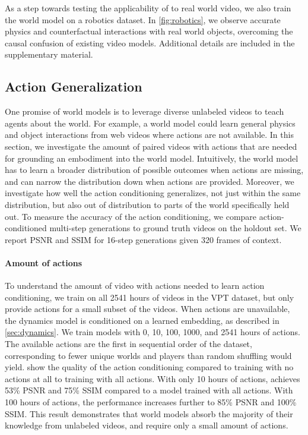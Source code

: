 \documentclass[11pt]{article}
\begin{document}
As a step towards testing the applicability of \method to real world video, we also train the world model on a robotics dataset\citep{soar}.
In \cref{fig:robotics}, we observe accurate physics and counterfactual interactions with real world objects, overcoming the causal confusion of existing video models.
Additional details are included in the supplementary material.

\subsection{Action Generalization}
\label{sec:actgen}

One promise of world models is to leverage diverse unlabeled videos to teach agents about the world.
For example, a world model could learn general physics and object interactions from web videos where actions are not available.
In this section, we investigate the amount of paired videos with actions that are needed for grounding an embodiment into the \method world model.
Intuitively, the world model has to learn a broader distribution of possible outcomes when actions are missing, and can narrow the distribution down when actions are provided.
Moreover, we investigate how well the action conditioning generalizes, not just within the same distribution, but also out of distribution to parts of the world specifically held out.
To measure the accuracy of the action conditioning, we compare action-conditioned multi-step generations to ground truth videos on the holdout set.
We report PSNR and SSIM for 16-step generations given 320 frames of context.



\paragraph{Amount of actions}
To understand the amount of video with actions needed to learn action conditioning, we train \method on all 2541 hours of videos in the VPT dataset, but only provide actions for a small subset of the videos.
When actions are unavailable, the dynamics model is conditioned on a learned embedding, as described in \cref{sec:dynamics}.
We train \method models with 0, 10, 100, 1000, and 2541 hours of actions.
The available actions are the first in sequential order of the dataset, corresponding to fewer unique worlds and players than random shuffling would yield.
 show the quality of the action conditioning compared to training with no actions at all to training with all actions.
With only 10 hours of actions, \method achieves 53\% PSNR and 75\% SSIM compared to a model trained with all actions.
With 100 hours of actions, the performance increases further to 85\% PSNR and 100\% SSIM.
This result demonstrates that world models absorb the majority of their knowledge from unlabeled videos, and require only a small amount of actions.
\end{document}

